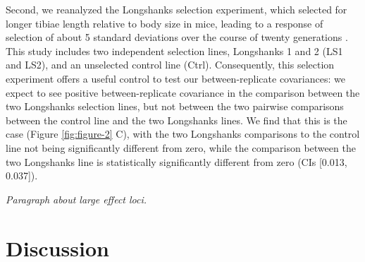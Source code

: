 \documentclass[11pt]{article}
\newcommand{\gc}[1]{{\it \color{red} #1 } }
\begin{document}

Second, we reanalyzed the Longshanks selection experiment, which selected for
longer tibiae length relative to body size in mice, leading to a response of
selection of about 5 standard deviations over the course of twenty generations
\parencite{Castro2019-uk}. This study includes two independent selection lines,
Longshanks 1 and 2 (LS1 and LS2), and an unselected control line (Ctrl).
Consequently, this selection experiment offers a useful control to test our
between-replicate covariances: we expect to see positive between-replicate
covariance in the comparison between the two Longshanks selection lines, but
not between the two pairwise comparisons between the control line and the two
Longshanks lines. We find that this is the case (Figure \ref{fig:figure-2} C),
with the two Longshanks comparisons to the control line not being significantly
different from zero, while the comparison between the two Longshanks line is
statistically significantly different from zero (CIs [0.013, 0.037]).

\gc{Paragraph about large effect loci.}

\section{Discussion}
\end{document}
